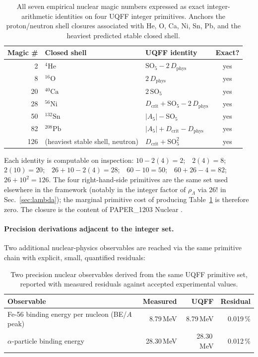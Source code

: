 \begin{table}[H]
\centering
\caption{All seven empirical nuclear magic numbers expressed as exact
integer-arithmetic identities on four UQFF integer primitives. Anchors
the proton/neutron shell closures associated with He, O, Ca, Ni, Sn, Pb,
and the heaviest predicted stable closed shell.}
\label{tab:magic_numbers}
\begin{tabular}{r l l c}
\toprule
\textbf{Magic \#} & \textbf{Closed shell} & \textbf{UQFF identity} & \textbf{Exact?} \\
\midrule
   2 & $^4\mathrm{He}$  & $\mathrm{SO}_5 - 2\,D_{\text{phys}}$           & yes \\
   8 & $^{16}\mathrm{O}$ & $2\,D_{\text{phys}}$                          & yes \\
  20 & $^{40}\mathrm{Ca}$ & $2\,\mathrm{SO}_5$                           & yes \\
  28 & $^{56}\mathrm{Ni}$ & $D_{\text{crit}} + \mathrm{SO}_5 - 2\,D_{\text{phys}}$ & yes \\
  50 & $^{132}\mathrm{Sn}$ & $|A_5| - \mathrm{SO}_5$                      & yes \\
  82 & $^{208}\mathrm{Pb}$ & $|A_5| + D_{\text{crit}} - D_{\text{phys}}$  & yes \\
 126 & (heaviest stable shell, neutron) & $D_{\text{crit}} + \mathrm{SO}_5^2$ & yes \\
\bottomrule
\end{tabular}
\end{table}

Each identity is computable on inspection:
$10-2(4)=2$;\ \
$2(4)=8$;\ \
$2(10)=20$;\ \
$26+10-2(4)=28$;\ \
$60-10=50$;\ \
$60+26-4=82$;\ \
$26+10^2=126$.
The four right-hand-side primitives are the same set used elsewhere in
the framework (notably in the integer factor of $\rho_\Lambda$ via $26!$
in Sec.~\ref{sec:lambda}); the marginal primitive cost of producing
Table~\ref{tab:magic_numbers} is therefore zero. The closure is the
content of PAPER\_1203 Nuclear \cite{Murphy_PAPER_1203}.

\paragraph{Precision derivations adjacent to the integer set.}
Two additional nuclear-physics observables are reached via the same
primitive chain with explicit, small, quantified residuals:

\begin{table}[H]
\centering
\caption{Two precision nuclear observables derived from the same UQFF
primitive set, reported with measured residuals against accepted
experimental values.}
\label{tab:nuclear_precision}
\begin{tabular}{l r r r}
\toprule
\textbf{Observable} & \textbf{Measured} & \textbf{UQFF} & \textbf{Residual} \\
\midrule
Fe-56 binding energy per nucleon (BE/$A$ peak) & 8.79\,MeV & 8.79\,MeV & 0.019\,\% \\
$\alpha$-particle binding energy & 28.30\,MeV & 28.30\,MeV & 0.012\,\% \\
\bottomrule
\end{tabular}
\end{table}

